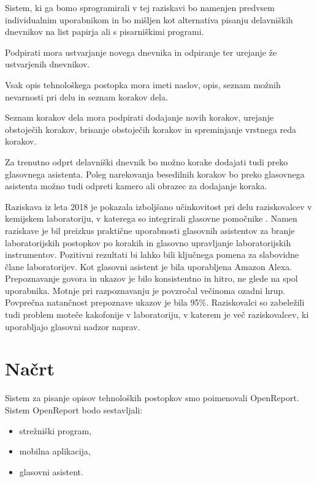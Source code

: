 \documentclass[a4paper, 12pt]{book}
\begin{document}
Sistem, ki ga bomo sprogramirali v tej raziskavi bo namenjen predvsem individualnim uporabnikom in bo mišljen kot alternativa pisanju delavniških dnevnikov na list papirja ali s pisarniškimi programi.

Podpirati mora ustvarjanje novega dnevnika in odpiranje ter urejanje že ustvarjenih dnevnikov.

Vsak opis tehnološkega postopka mora imeti naslov, opis, seznam možnih nevarnosti pri delu in seznam korakov dela.

Seznam korakov dela mora podpirati dodajanje novih korakov, urejanje obstoječih korakov, brisanje obstoječih korakov in spreminjanje vrstnega reda korakov.

Za trenutno odprt delavniški dnevnik bo možno korake dodajati tudi preko glasovnega asistenta.
Poleg narekovanja besedilnih korakov bo preko glasovnega asistenta možno tudi odpreti kamero ali obrazec za dodajanje koraka.

Raziskava iz leta 2018 je pokazala izboljšano učinkovitost pri delu raziskovalcev v kemijskem laboratoriju, v katerega so integrirali glasovne pomočnike \cite{austerjost2018introducing}.
Namen raziskave je bil preizkus praktične uporabnosti glasovnih asistentov za branje laboratorijskih postopkov po korakih in glasovno upravljanje laboratorijskih instrumentov.
Pozitivni rezultati bi lahko bili ključnega pomena za slabovidne člane laboratorijev.
Kot glasovni asistent je bila uporabljena Amazon Alexa.
Prepoznavanje govora in ukazov je bilo konsistentno in hitro, ne glede na spol uporabnika.
Motnje pri razpoznavanju je povzročal večinoma ozadni hrup.
Povprečna natančnost prepoznave ukazov je bila 95\%.
Raziskovalci so zabeležili tudi problem moteče kakofonije v laboratoriju, v katerem je več raziskovalcev, ki uporabljajo glasovni nadzor naprav.

\section{Načrt}

Sistem za pisanje opisov tehnoloških postopkov smo poimenovali OpenReport. 
Sistem OpenReport bodo sestavljali:

\begin{itemize}
	\item strežniški program, 
	\item mobilna aplikacija,
	\item glasovni asistent.
\end{itemize}
\end{document}
